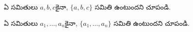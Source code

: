 \documentclass[../../../include/open-logic-section]{subfiles}
\begin{document}
\begin{prob}
ఏ సమితులు $a, b, c$కైనా,
$\{a, b, c\}$ సమితి
ఉంటుందని చూపండి.
\end{prob}

\begin{prob}
ఏ సమితులు $a_1, \ldots, a_n$కైనా,
$\{a_1, \ldots,
a_n\}$ సమితి ఉంటుందని
చూపండి.
\end{prob}

\end{document}
